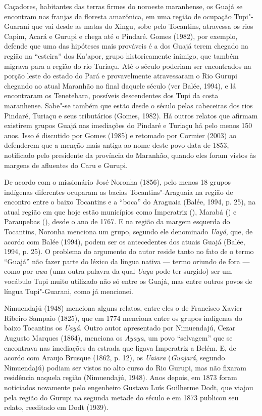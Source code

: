 Caçadores, habitantes das terras firmes do noroeste maranhense, os Guajá
se encontram nas franjas da floresta amazônica, em uma região de
ocupação Tupi"-Guarani que vai desde as matas do Xingu, sobe pelo
Tocantins, atravessa os rios Capim, Acará e Gurupi e chega até o
Pindaré. Gomes (1982), por exemplo, defende que uma das hipóteses mais
prováveis é a dos Guajá terem chegado na região na ``esteira'' dos
Ka'apor, grupo historicamente inimigo, que também migrava para a região
do rio Turiaçu. Até o século  poderiam ser encontrados na porção
leste do estado do Pará e provavelmente atravessaram o Rio Gurupi
chegando ao atual Maranhão no final daquele século (ver Balée, 1994), e
lá encontraram os Tenetehara, possíveis descendentes dos Tupi da costa
maranhense. Sabe"-se também que estão desde o século  pelas cabeceiras
dos rios Pindaré, Turiaçu e seus tributários (Gomes, 1982). Há outros
relatos que afirmam existirem grupos Guajá nas imediações do Pindaré e
Turiaçu há pelo menos 150 anos. Isso é discutido por Gomes (1985) e
retomado por Cormier (2003) ao defenderem que a menção mais antiga ao
nome deste povo data de 1853, notificado pelo presidente da província do
Maranhão, quando eles foram vistos às margens de afluentes do Caru e
Gurupi.

De acordo com o missionário José Noronha (1856), pelo menos 18 grupos
indígenas diferentes ocuparam as bacias Tocantins"-Araguaia na região de
encontro entre o baixo Tocantins e a ``boca'' do Araguaia (Balée, 1994,
p. 25), na atual região em que hoje estão municípios como Imperatriz
(), Marabá () e Paraupebas (), desde
o ano de 1767. E na região da
margem esquerda do Tocantins, Noronha menciona um grupo, segundo ele
denominado \emph{Uayá}, que, de acordo com Balée (1994), podem ser os
antecedentes dos atuais Guajá (Balée, 1994, p. 25). O problema do
argumento do autor reside tanto no fato de o termo ``Guajá'' não fazer
parte do léxico da língua nativa --- termo oriundo de fora --- como por
\emph{awa} (uma outra palavra da qual \emph{Uaya} pode ter surgido) ser
um vocábulo Tupi muito utilizado não só entre os Guajá, mas entre outros
povos de língua Tupi"-Guarani, como já mencionei.

Nimuendajú (1948) menciona alguns relatos, entre eles o de Francisco
Xavier Ribeiro Sampaio (1825), que em 1774 menciona entre os grupos
indígenas do baixo Tocantins os \emph{Uayá}. Outro autor apresentado por
Nimuendajú, Cezar Augusto Marques (1864), menciona os \emph{Ayaya}, um
povo ``selvagem'' que se encontrava nas imediações da estrada que ligava
Imperatriz a Belém. E, de acordo com Araujo Brusque (1862, p. 12), os
\emph{Uaiara} (\emph{Guajará}, segundo Nimuendajú) podiam ser vistos no
alto curso do Rio Gurupi, mas não fixaram residência naquela região
(Nimuendajú, 1948). Anos depois, em 1873 foram noticiados novamente pelo
engenheiro Gustavo Luís Guilherme Dodt, que viajou pela região do Gurupi
na segunda metade do século  e em 1873 publicou seu relato, reeditado
em Dodt (1939).

